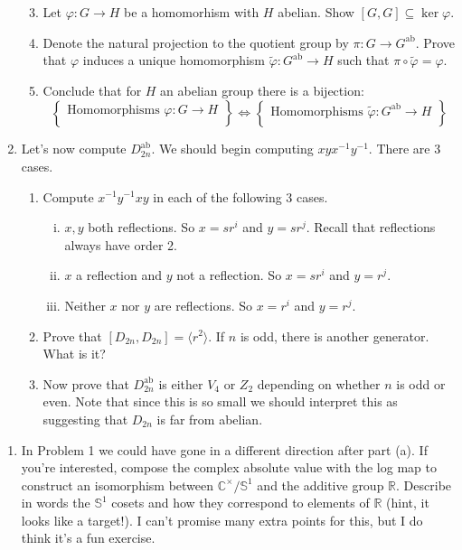 \documentclass[11pt]{article}
\newcommand{\la}{\langle}
\newcommand{\ra}{\rangle}
\newcommand{\ab}{\mathrm{ab}}
\newcommand{\bC}{\mathbb{C}}
\newcommand{\bR}{\mathbb{R}}
\newcommand{\bS}{\mathbb{S}}
\begin{document}
\begin{enumerate}
  \begin{enumerate}
    \setcounter{enumii}{2}
    \item Let $\varphi:G\to H$ be a homomorhism with $H$ abelian.  Show $[G,G]\subseteq\ker\varphi$.
    \item Denote the natural projection to the quotient group by $\pi:G\to G^\ab$.  Prove that $\varphi$ induces a unique homomorphism $\tilde\varphi:G^\ab\to H$ such that $\pi\circ\tilde\varphi = \varphi$.
    \item Conclude that for $H$ an abelian group there is a bijection:
    \[\left\{
    \begin{array}{c}
      \text{Homomorphisms }\varphi:G\to H\\
    \end{array}\right\}
    \Longleftrightarrow
    \left\{
    \begin{array}{c}
      \text{Homomorphisms }\tilde\varphi:G^\ab\to H\\
    \end{array}
    \right\}
    \]
  \end{enumerate}
  \item Let's now compute $D_{2n}^\ab$.  We should begin computing $xyx^{-1}y^{-1}$.  There are 3 cases.
  \begin{enumerate}
    \item Compute $x^{-1}y^{-1}xy$ in each of the following 3 cases.
    \begin{enumerate}[(i)]
      \item $x,y$ both reflections.  So $x=sr^i$ and $y=sr^j$.  Recall that reflections always have order 2.
      \item $x$ a reflection and $y$ not a reflection.  So $x=sr^i$ and $y=r^j$.
      \item Neither $x$ nor $y$ are reflections.  So $x=r^i$ and $y=r^j$.
    \end{enumerate}
    \item Prove that $[D_{2n},D_{2n}] = \la r^2\ra$.  If $n$ is odd, there is another generator.  What is it?
    \item Now prove that $D_{2n}^\ab$ is either $V_4$ or $Z_2$ depending on whether $n$ is odd or even.  Note that since this is so small we should interpret this as suggesting that $D_{2n}$ is far from abelian.
  \end{enumerate}
\end{enumerate}
\begin{enumerate}
  \item In Problem 1 we could have gone in a different direction after part (a).  If you're interested, compose the complex absolute value with the log map to construct an isomorphism between $\bC^\times/\bS^1$ and the additive group $\bR$.  Describe in words the $\bS^1$ cosets and how they correspond to elements of $\bR$ (hint, it looks like a target!).  I can't promise many extra points for this, but I do think it's a fun exercise.
\end{enumerate}
\end{document}
